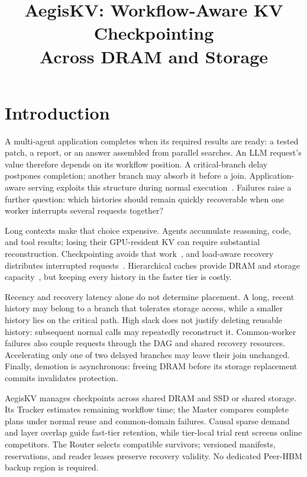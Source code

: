 \documentclass[sigplan,10pt,anonymous,nonacm]{acmart}
\title{AegisKV: Workflow-Aware KV Checkpointing\texorpdfstring{\\}{ }Across DRAM and Storage}
\begin{document}
\pagestyle{aegispreview}

\maketitle
\thispagestyle{aegispreview}
\raggedbottom

\section{Introduction}
\label{sec:introduction}

A multi-agent application completes when its required results are ready:
a tested patch, a report, or an answer assembled from parallel searches.
An LLM request's value therefore depends on its workflow position. A
critical-branch delay postpones completion; another branch may absorb it
before a join. Application-aware serving exploits this structure during
normal execution~\cite{lin2024parrot,pan2025kvflow,ni2026topas}. Failures
raise a further question: which histories should remain quickly
recoverable when one worker interrupts several requests together?

Long contexts make that choice expensive. Agents accumulate reasoning,
code, and tool results; losing their GPU-resident KV can require substantial
reconstruction. Checkpointing avoids that work~\cite{strati2024dejavu,jayakody2026ghostserve},
and load-aware recovery distributes interrupted requests~\cite{cao2026lumen}.
Hierarchical caches provide DRAM and storage capacity~\cite{qin2025mooncake,xie2026strata},
but keeping every history in the faster tier is costly.

Recency and recovery latency alone do not determine placement. A long,
recent history may belong to a branch that tolerates storage access,
while a smaller history lies on the critical path. High slack does not
justify deleting reusable history: subsequent normal calls may repeatedly
reconstruct it. Common-worker failures also couple requests through the
DAG and shared recovery resources. Accelerating only one of two delayed
branches may leave their join unchanged. Finally, demotion is asynchronous:
freeing DRAM before its storage replacement commits invalidates protection.

AegisKV manages checkpoints across shared DRAM and SSD or shared storage.
Its Tracker estimates remaining workflow time; the Master compares
complete plans under normal reuse and common-domain failures. Causal
sparse demand and layer overlap guide fast-tier retention, while tier-local
trial rent screens online competitors. The Router selects compatible
survivors; versioned manifests, reservations, and reader leases preserve
recovery validity. No dedicated Peer-HBM backup region is required.
\end{document}
